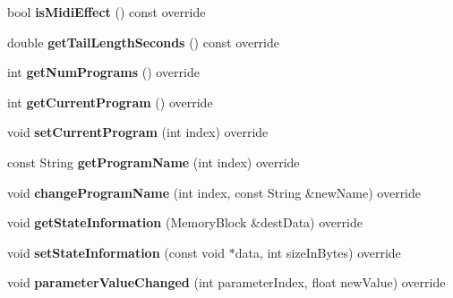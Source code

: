 \begin{DoxyCompactItemize}
\item 
\mbox{\label{class_wrapped_processor_a59c97dad39e2277bab451cea9af1b726}} 
bool {\bfseries is\+Midi\+Effect} () const override
\item 
\mbox{\label{class_wrapped_processor_a0edf29836ba61c8cb66633dad6c5830c}} 
double {\bfseries get\+Tail\+Length\+Seconds} () const override
\item 
\mbox{\label{class_wrapped_processor_a50aa2997c5c87fac02127e547b53babe}} 
int {\bfseries get\+Num\+Programs} () override
\item 
\mbox{\label{class_wrapped_processor_a279ec13fdc234dbe3ba6850d93829ba7}} 
int {\bfseries get\+Current\+Program} () override
\item 
\mbox{\label{class_wrapped_processor_a7f287cb51a79f739f0f4db5e4189d83a}} 
void {\bfseries set\+Current\+Program} (int index) override
\item 
\mbox{\label{class_wrapped_processor_a20264224c9a06f3eb77dd4d1ae2dd60a}} 
const String {\bfseries get\+Program\+Name} (int index) override
\item 
\mbox{\label{class_wrapped_processor_a00c519e9cb9bca4e5e23b1143fbeef33}} 
void {\bfseries change\+Program\+Name} (int index, const String \&new\+Name) override
\item 
\mbox{\label{class_wrapped_processor_a2f8d12fe4fefeeccd742830c58cab2ab}} 
void {\bfseries get\+State\+Information} (Memory\+Block \&dest\+Data) override
\item 
\mbox{\label{class_wrapped_processor_a51a5e6561b9aabc743f9f5a1f509afd0}} 
void {\bfseries set\+State\+Information} (const void $\ast$data, int size\+In\+Bytes) override
\item 
\mbox{\label{class_wrapped_processor_a28ba91aa153d66683fca2394300444fd}} 
void {\bfseries parameter\+Value\+Changed} (int parameter\+Index, float new\+Value) override

\end{DoxyCompactItemize}
